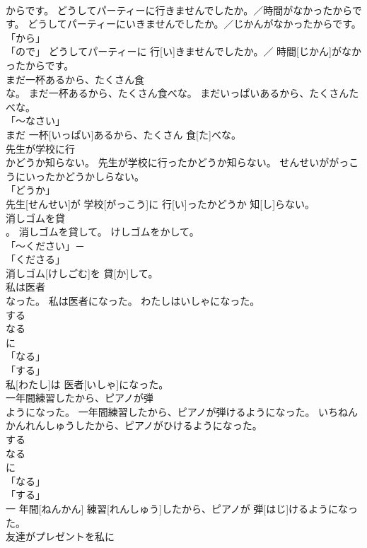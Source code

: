 \documentclass[8pt]{extreport}
\begin{document}
\begin{CJK}{UTF8}{min}
\\	からです。	どうしてパーティーに行きませんでしたか。／時間がなかったからです。	どうしてパーティーにいきませんでしたか。／じかんがなかったからです。	
\\	「から」 
\\	「ので」	どうしてパーティーに 行[い]きませんでしたか。／ 時間[じかん]がなかったからです。		
\\	まだ一杯あるから、たくさん食
\\	な。	まだ一杯あるから、たくさん食べな。	まだいっぱいあるから、たくさんたべな。	
\\	「～なさい」 
\\	まだ 一杯[いっぱい]あるから、たくさん 食[た]べな。		
\\	先生が学校に行
\\	かどうか知らない。	先生が学校に行ったかどうか知らない。	せんせいががっこうにいったかどうかしらない。	
\\	「どうか」 
\\	先生[せんせい]が 学校[がっこう]に 行[い]ったかどうか 知[し]らない。		
\\	消しゴムを貸
\\	。	消しゴムを貸して。	けしゴムをかして。	
\\	「～ください」－ 
\\	「くださる」　
\\	消しゴム[けしごむ]を 貸[か]して。		
\\	私は医者
\\	なった。	私は医者になった。	わたしはいしゃになった。	
\\	する 
\\	なる 
\\	に 
\\	「なる」 
\\	「する」 
\\	私[わたし]は 医者[いしゃ]になった。		
\\	一年間練習したから、ピアノが弾
\\	ようになった。	一年間練習したから、ピアノが弾けるようになった。	いちねんかんれんしゅうしたから、ピアノがひけるようになった。	
\\	する 
\\	なる 
\\	に 
\\	「なる」 
\\	「する」 
\\	一 年間[ねんかん] 練習[れんしゅう]したから、ピアノが 弾[はじ]けるようになった。		
\\	友達がプレゼントを私に

\end{CJK}
\end{document}
